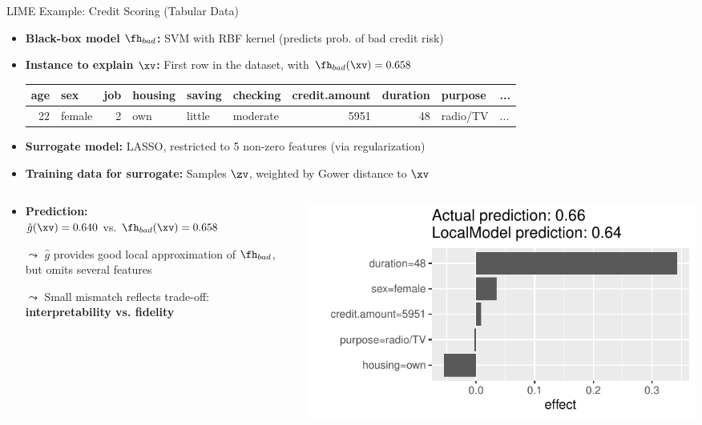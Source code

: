 \documentclass[11pt,compress,t,notes=noshow, aspectratio=169, xcolor=table]{beamer}
\newcommand{\gh}{\hat{g}}
\begin{document}
\begin{frame}{LIME Example: Credit Scoring (Tabular Data)}

\begin{itemize}
  \item \textbf{Black-box model \( \fh_{bad} \):} SVM with RBF kernel (predicts prob. of bad credit risk)
  \item \textbf{Instance to explain \( \xv \):} First row in the dataset, with \( \fh_{bad}(\xv) = 0.658 \)
{\scriptsize
\begin{tabular}{rlrlllrrll}
  \hline
  age & sex & job & housing & saving & checking & credit.amount & duration & purpose & ... \\
  \hline
  22 & female & 2 & own & little & moderate & 5951 & 48 & radio/TV & ... \\
  \hline
\end{tabular}
}
  \item \textbf{Surrogate model:} LASSO, restricted to 5 non-zero features (via regularization)
  \item \textbf{Training data for surrogate:} Samples \( \zv \), weighted by Gower distance to \( \xv \)
\end{itemize}
\pause
\begin{columns}[T,onlytextwidth]
  \begin{column}{0.5\textwidth}
    \begin{itemize}
      \item \textbf{Prediction:} \\
      \( \gh(\xv) = 0.640 \) vs. \( \fh_{bad}(\xv) = 0.658 \)
      \item[$\leadsto$] $\gh$ provides good local approximation of $\fh_{bad}$, but omits several features 
      \item[$\leadsto$] Small mismatch reflects trade-off:\\
      \textbf{interpretability vs. fidelity}
    \end{itemize}
  \end{column}

  \begin{column}{0.5\textwidth}
    \includegraphics[width=\linewidth]{figure/lime_credit.pdf}%
  \end{column}


\end{columns}
\end{frame}
\end{document}
